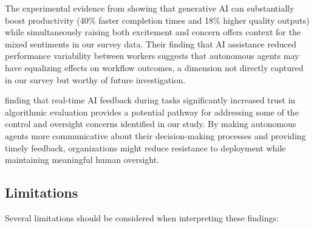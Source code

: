 \documentclass{article}
\begin{document}
The experimental evidence from \cite{NoyZhang2023} showing that
generative AI can substantially boost productivity (40\% faster
completion times and 18\% higher quality outputs) while simultaneously
raising both excitement and concern offers context for the mixed
sentiments in our survey data. Their finding that AI assistance reduced
performance variability between workers suggests that autonomous agents
may have equalizing effects on workflow outcomes, a dimension not
directly captured in our survey but worthy of future investigation.

\cite{Brown2025} finding that real-time AI feedback during tasks
significantly increased trust in algorithmic evaluation provides a
potential pathway for addressing some of the control and oversight
concerns identified in our study. By making autonomous agents more
communicative about their decision-making processes and providing timely
feedback, organizations might reduce resistance to deployment while
maintaining meaningful human oversight.

\subsection{Limitations}\label{limitations}

Several limitations should be considered when interpreting these
findings:
\end{document}
